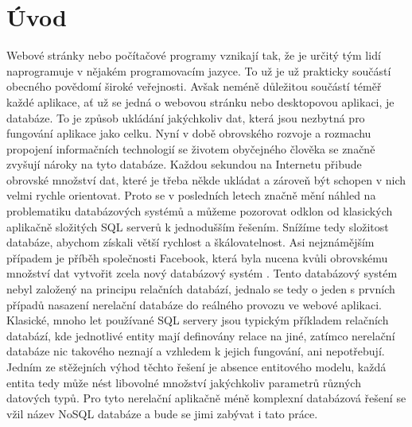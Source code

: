 

\chapter{Úvod}Webové stránky nebo počítačové programy vznikají tak, že je určitý tým lidí naprogramuje v nějakém programovacím jazyce. To už je už prakticky součástí obecného povědomí široké veřejnosti. Avšak neméně důležitou součástí téměř každé aplikace, ať už se jedná o webovou stránku nebo desktopovou aplikaci, je databáze. To je způsob ukládání jakýchkoliv dat, která jsou nezbytná pro fungování aplikace jako celku. Nyní v době obrovského rozvoje a rozmachu propojení informačních technologií se životem obyčejného člověka se značně zvyšují nároky na tyto databáze. Každou sekundou na Internetu přibude obrovské množství dat, které je třeba někde ukládat a zároveň být schopen v nich velmi rychle orientovat. Proto se v posledních letech značně mění náhled na problematiku databázových systémů a můžeme pozorovat odklon od klasických aplikačně složitých SQL serverů k jednodušším řešením. Snížíme tedy složitost databáze,  abychom získali větší rychlost a škálovatelnost. Asi nejznámějším případem je příběh společnosti Facebook, která byla nucena kvůli obrovskému množství dat vytvořit zcela nový databázový systém \cite{cassandra}. Tento databázový systém nebyl založený na principu relačních databází, jednalo se tedy o jeden s prvních případů nasazení nerelační databáze do reálného provozu ve webové aplikaci.  Klasické, mnoho let používané SQL servery jsou typickým příkladem relačních databází, kde jednotlivé entity mají definovány relace na jiné, zatímco  nerelační databáze nic takového neznají a vzhledem k jejich fungování, ani nepotřebují. Jedním ze stěžejních výhod těchto řešení je absence entitového modelu, každá entita tedy může nést libovolné množství jakýchkoliv parametrů různých datových typů. Pro tyto nerelační aplikačně méně komplexní databázová řešení se vžil název NoSQL databáze a bude se jimi zabývat i tato práce.

